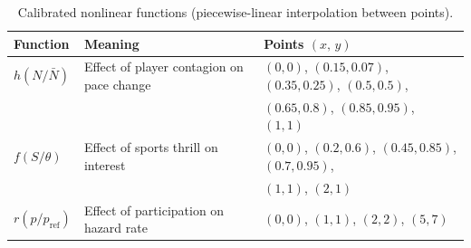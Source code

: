 \begin{table}[htbp]
  \centering
  \small
  \caption{Calibrated nonlinear functions (piecewise-linear
  interpolation between points).}
  \label{tab:functions}
  \begin{tabular}{@{}lll@{}}
    \toprule
    Function & Meaning & Points $(x,\, y)$ \\
    \midrule
    $h(N/\bar{N})$ & Effect of player contagion on pace change &
      $(0,0)$, $(0.15,0.07)$, $(0.35,0.25)$, $(0.5,0.5)$, \\
    & & $(0.65,0.8)$, $(0.85,0.95)$, $(1,1)$ \\[2pt]
    $f(S/\theta)$ & Effect of sports thrill on interest &
      $(0,0)$, $(0.2,0.6)$, $(0.45,0.85)$, $(0.7,0.95)$, \\
    & & $(1,1)$, $(2,1)$ \\[2pt]
    $r(p/p_{\mathrm{ref}})$ & Effect of participation on hazard rate &
      $(0,0)$, $(1,1)$, $(2,2)$, $(5,7)$ \\
    \bottomrule
  \end{tabular}
\end{table}
